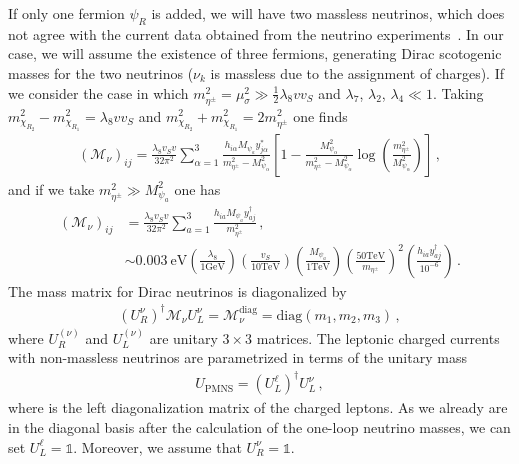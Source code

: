 \documentclass[12pt]{article}
\begin{document}
If only one
fermion $\psi_R$ is added, we will have two massless neutrinos, which
does not agree with the current data obtained from the neutrino
experiments~\cite{deSalas:2017kay}. In our case, we will assume the
existence of three fermions, generating Dirac scotogenic masses for
the two neutrinos ($\nu_{k}$ is massless due to the assignment of
charges). If we consider the case in which $m_{\eta^{\pm}}^2 = \mu^2_{\sigma} \gg \frac{1}{2} \lambda_8 v v_S$ and $\lambda_7$, $\lambda_2$, $\lambda_4 \ll 1$. Taking $m^2_{\chi_{R_{2}}}-m^2_{\chi_{R_{1}}} = \lambda_8 v v_{S}$ and $m^2_{\chi_{R_{2}}}+m^2_{\chi_{R_{1}}} = 2 m_{\eta^{\pm}}^{2}$ one finds
%
\begin{align*}
(\mathcal{M}_{\nu})_{ij} = \frac{\lambda_8 v_S v}{32 \pi^{2}} \sum_{\alpha=1}^{3} \frac{h_{i \alpha} M_{\psi_{a}}y^{*}_{j\alpha}} {m_{\eta^{\pm}}^{2}-M_{\psi_{\alpha}}^{2}} \left[1 - \frac{M_{\psi_{\alpha}}^{2}}{m_{\eta^{\pm}}^{2}-M_{\psi_{\alpha}}^{2}} \log \left( \frac{m_{\eta^{\pm}}^{2}}{M_{\psi_{\alpha}}^{2}} \right)\right]\,,
\end{align*}
%
and if we take $m_{\eta^{\pm}}^{2} \gg M_{\psi_{a}}^{2}$ one has 
%
\begin{align}
(\mathcal{M}_{\nu})_{ij} & = \frac{\lambda_8 v_S v}{32 \pi^{2}} \sum_{a=1}^{3} \frac{h_{i a} M_{\psi_{a}}y^{\dagger}_{a j}} {m_{\eta^{\pm}}^{2}}\,, \\
& \sim 0.003~\text{eV} \left( \frac{\lambda_8}{1 \text{GeV}}\right) \left( \frac{v_{S}}{10 \text{TeV}}\right) \left( \frac{M_{\psi_{a}}}{1 \text{TeV}}\right) \left( \frac{50 \text{TeV}}{m_{\eta^{\pm}}}\right)^{2} \left( \frac{h_{i a} y_{a j}^{\dagger}}{10^{-6}}\right)\,. \nonumber
\end{align}
%
The mass matrix for Dirac neutrinos is diagonalized by
\begin{align*}
(U^{\nu}_R)^{\dagger} \mathcal{M}_{\nu} U^{\nu}_L = \mathcal{M}_{\nu}^{\text{diag}} = \text{diag}(m_1, m_2, m_3)\,,
\end{align*}
where $U^{(\nu)}_R$ and $U^{(\nu)}_L$ are unitary $3 \times 3$
matrices. The leptonic charged currents with non-massless neutrinos
are parametrized in terms of the unitary mass
\begin{align*}
U_{\text{PMNS}} = \left( U^{\ell}_L \right)^{\dagger} U^{\nu}_L\,,
\end{align*}
where is the left diagonalization matrix of the charged leptons.
As we already are in the diagonal basis after the calculation of the
one-loop neutrino masses, we can set
$U_{L}^{\ell} = \mathds{1}$. Moreover, we assume that $U_{R}^{\nu} = \mathds{1}$.
\end{document}
